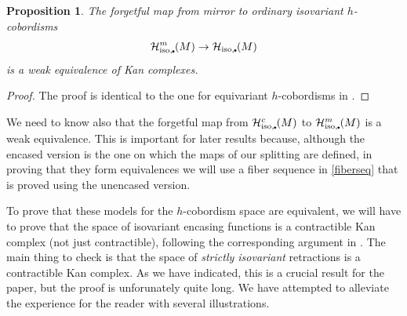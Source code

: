 \documentclass[11pt]{amsart}
\newtheorem{prop}{Proposition}[section]
\theoremstyle{definition}
\numberwithin{equation}{section}
\numberwithin{figure}{section}
\newcommand{\mc}{\mathcal}
\newcommand{\mirror}{{mirror}}
\newcommand{\iso}{\mathrm{iso}}
\newcommand{\sbt}{\,\begin{picture}(-1,1)(0.5,-1)\circle*{1.8}\end{picture}\hspace{.05cm}}
\newcommand{\arhperiod}{an encasing function. }
\newcommand{\rhs}{encasing functions }
\begin{document}
\begin{prop}\label{space_of_mirrorhcob}
The forgetful map from mirror to ordinary isovariant $h$-cobordisms
\[ \mc H_{\iso,\sbt}^m(M) \to \mc H_{\iso,\sbt}(M) \]
is a weak equivalence of Kan complexes.
\end{prop}

\begin{proof}
The proof is identical to the one for equivariant $h$-cobordisms in \cite[Prop 4.13]{GIMM1}.
\end{proof}

We need to know also that the forgetful map from $\mc H_{\iso,\sbt}^c(M)$ to $\mc H_{\iso,\sbt}^m(M)$ is a weak equivalence. This is important for later results because, although the encased version is the one on which the maps of our splitting are defined, in proving that they form equivalences we will use a fiber sequence in \autoref{fiberseq} that is proved using the unencased version.

To prove that these models for the $h$-cobordism space are equivalent, we will have to prove that the space of isovariant encasing functions is a contractible Kan complex (not just contractible), following the corresponding argument in \cite[Prop 4.16]{GIMM1}. The main thing to check is that the space of \emph{strictly isovariant} retractions is a contractible Kan complex. As we have indicated, this is a crucial result for the paper, but the proof is unforunately quite long. We have attempted to alleviate the experience for the reader with several illustrations.


\end{document}
